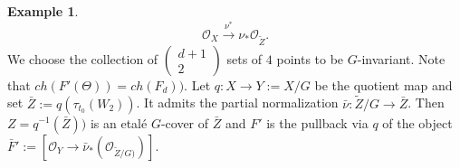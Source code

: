 \documentclass[12pt]{amsart}
\newcommand{\hide}[1]{}
\numberwithin{equation}{subsection}
\theoremstyle{plain}
\theoremstyle{definition}
\newtheorem{question}[thm]{Question}
\newtheorem{example}[thm]{Example}
\newcommand{\RightArrowOf}[1]{\stackrel{#1}{\rightarrow}}
\newcommand{\StructureSheaf}[1]{{\mathcal O}_{#1}}
\newcommand{\Ext}{{\rm Ext}}
\newcommand{\Ideal}[1]{{\mathcal I}_{#1}}
\newcommand{\Choose}[2]
{\left(\!\!\begin{array}{c}#1\\#2\end{array}\!\!\right)}
\begin{document}
\begin{example}
\begin{equation}
\label{eq-F-1-over-jacobian-of-genus-4-curve}
\StructureSheaf{X}\RightArrowOf{\nu^*} \nu_*\StructureSheaf{\tilde{Z}}.
\end{equation}
We choose the collection of $\Choose{d+1}{2}$ sets of $4$ points to be $G$-invariant. Note that $ch(F'(\Theta))=ch(F_d))$. 
Let $q:X\rightarrow Y:=X/G$ be the quotient map and set $\bar{Z}:=q(\tau_{t_0}(W_2))$. 
It admits the partial normalization $\bar{\nu}:\tilde{Z}/G\rightarrow \bar{Z}$.
Then $Z=q^{-1}(\bar{Z}))$ is an etal\'{e} $G$-cover of $\bar{Z}$ and $F'$ is the pullback via $q$ of the object $\bar{F}':=\left[\StructureSheaf{Y}\rightarrow \bar{\nu}_*(\StructureSheaf{\tilde{Z}/G)})\right]$. 
\end{example}

\hide{
\begin{question}
Is the restriction of the semiregularity map to $\Ext^2(F',F')^{G_1}$ injective? Equivalently, is the object $\bar{F}'$ semiregular?
\end{question}

The analogous question in the genus $3$ case for the sheaf $\Ideal{\cup_{i=1}^{d+1}C_i}$ of Lemma \ref{lemma-ch-F-i-is-on-secant-to-spinor-variety} has an affirmative answer (see Lemma \ref{lemma-Yoneda-algebra-is-generated-in-degree-1} and Corollary \ref{cor-kernel-of-obstruction-is-annihilator-of-ch}, which imply the semiregularity via Lemma \ref{lemma-criterion-for-semiregularity}).
}
\end{document}
